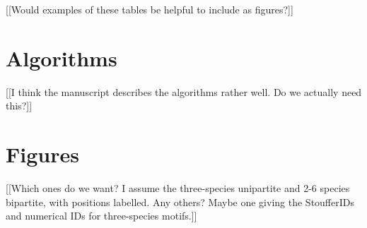 \documentclass[12pt]{article}
\begin{document}
			[[Would examples of these tables be helpful to include as figures?]]

\section{Algorithms}

	[[I think the manuscript describes the algorithms rather well. Do we actually need this?]]

\section{Figures}


	[[Which ones do we want? I assume the three-species unipartite and 2-6 species bipartite, with positions labelled. Any others? Maybe one giving the StoufferIDs and numerical IDs for three-species motifs.]]
\end{document}
